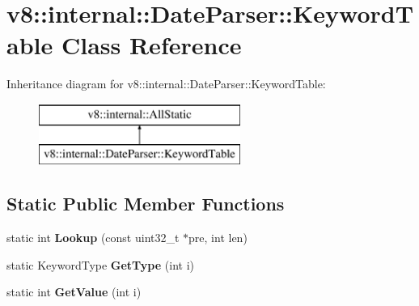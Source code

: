 \hypertarget{classv8_1_1internal_1_1_date_parser_1_1_keyword_table}{}\section{v8\+:\+:internal\+:\+:Date\+Parser\+:\+:Keyword\+Table Class Reference}
\label{classv8_1_1internal_1_1_date_parser_1_1_keyword_table}
Inheritance diagram for v8\+:\+:internal\+:\+:Date\+Parser\+:\+:Keyword\+Table\+:\begin{figure}[H]
\begin{center}
\leavevmode
\includegraphics[height=2.000000cm]{classv8_1_1internal_1_1_date_parser_1_1_keyword_table}
\end{center}
\end{figure}
\subsection*{Static Public Member Functions}
\begin{DoxyCompactItemize}
\item 
static int {\bfseries Lookup} (const uint32\+\_\+t $\ast$pre, int len)\hypertarget{classv8_1_1internal_1_1_date_parser_1_1_keyword_table_a334e266f69b8626a8f703f78ada511ca}{}\label{classv8_1_1internal_1_1_date_parser_1_1_keyword_table_a334e266f69b8626a8f703f78ada511ca}

\item 
static Keyword\+Type {\bfseries Get\+Type} (int i)\hypertarget{classv8_1_1internal_1_1_date_parser_1_1_keyword_table_a86afc07c4dae4e78b086e31893f5579f}{}\label{classv8_1_1internal_1_1_date_parser_1_1_keyword_table_a86afc07c4dae4e78b086e31893f5579f}

\item 
static int {\bfseries Get\+Value} (int i)\hypertarget{classv8_1_1internal_1_1_date_parser_1_1_keyword_table_a81e3d24c2ae2d60d3c1c80e3bafa758b}{}\label{classv8_1_1internal_1_1_date_parser_1_1_keyword_table_a81e3d24c2ae2d60d3c1c80e3bafa758b}

\end{DoxyCompactItemize}
